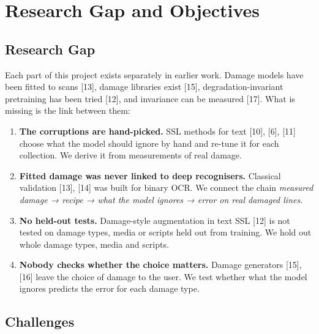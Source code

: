 \documentclass[
  12pt,
  a4paper,
]{report}
\providecommand{\tightlist}{%
  \setlength{\itemsep}{0pt}\setlength{\parskip}{0pt}}
\begin{document}
\chapter{Research Gap and Objectives}\label{research-gap-and-objectives}

\section{Research Gap}\label{research-gap}

Each part of this project exists separately in earlier work. Damage
models have been fitted to scans {[}13{]}, damage libraries exist
{[}15{]}, degradation-invariant pretraining has been tried {[}12{]}, and
invariance can be measured {[}17{]}. What is missing is the link between
them:

\begin{enumerate}
\def\labelenumi{\arabic{enumi}.}
\tightlist
\item
  \textbf{The corruptions are hand-picked.} SSL methods for text
  {[}10{]}, {[}6{]}, {[}11{]} choose what the model should ignore by
  hand and re-tune it for each collection. We derive it from
  measurements of real damage.
\item
  \textbf{Fitted damage was never linked to deep recognisers.} Classical
  validation {[}13{]}, {[}14{]} was built for binary OCR. We connect the
  chain \emph{measured damage → recipe → what the model ignores → error
  on real damaged lines}.
\item
  \textbf{No held-out tests.} Damage-style augmentation in text SSL
  {[}12{]} is not tested on damage types, media or scripts held out from
  training. We hold out whole damage types, media and scripts.
\item
  \textbf{Nobody checks whether the choice matters.} Damage generators
  {[}15{]}, {[}16{]} leave the choice of damage to the user. We test
  whether what the model ignores predicts the error for each damage
  type.
\end{enumerate}

\section{Challenges}\label{challenges}
\end{document}
